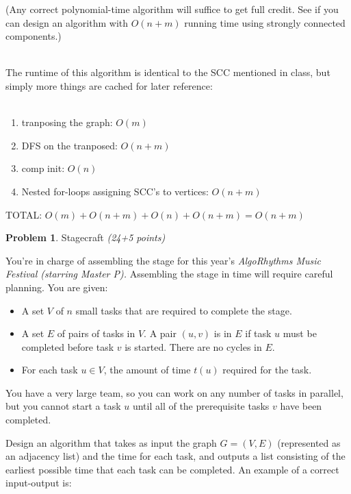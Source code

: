 \documentclass[11pt]{article}
\theoremstyle{definition}
\theoremstyle{theorem}
\newtheorem{prob}{Problem}
\newcommand{\solution}{\medskip\noindent{\color{DarkBlue}\textbf{Solution:}}}
\begin{document}
\begin{enumerate}[label=(\alph*)]
\begin{enumerate}[label=(\roman*)]
    (Any correct polynomial-time algorithm will suffice to get full
    credit.  See if you can design an algorithm with $O(n + m)$
    running time using strongly connected components.)

\solution \\

The runtime of this algorithm is identical to the SCC mentioned in class, but simply more things are cached for later reference:\\\\
\begin{enumerate}
	\item tranposing the graph: $O(m)$
	\item DFS on the tranposed: $O(n + m)$
	\item comp init: $O(n)$
	\item Nested for-loops assigning SCC's to vertices: $O(n + m)$
\end{enumerate}

TOTAL: $O(m) + O(n + m) + O(n) + O(n + m) = O(n + m)$

  \end{enumerate}
\end{enumerate}

\newpage



\begin{prob}Stagecraft  \emph{(24+5 points)}\end{prob}

You're in charge of assembling the stage for this year's \emph{AlgoRhythms Music Festival (starring Master P).}  Assembling the stage in time will require careful planning.  You are given:
\begin{itemize}
\item A set $V$ of $n$ small tasks that are required to complete the stage.
\item A set $E$ of pairs of tasks in $V$. A pair $(u,v)$ is in $E$ if task $u$ must be completed before task $v$ is started. There are no cycles in $E.$
\item For each task $u \in V$, the amount of time $t(u)$ required for the task.
\end{itemize}
You have a very large team, so you can work on any number of tasks in parallel, but you cannot start a task $u$ until all of the prerequisite tasks $v$ have been completed.

Design an algorithm that takes as input the graph $G = (V,E)$ (represented as an adjacency list) and the time for each task, and outputs a list consisting of the earliest possible time that each task can be completed.  An example of a correct input-output is:
\end{document}
